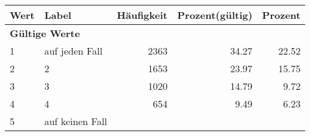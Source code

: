      \begin{longtable}{lXrrr}
     \toprule
     \textbf{Wert} & \textbf{Label} & \textbf{Häufigkeit} & \textbf{Prozent(gültig)} & \textbf{Prozent} \\
     \endhead
     \midrule
     \multicolumn{5}{l}{\textbf{Gültige Werte}}\\

     1 &
     \multicolumn{1}{X}{ auf jeden Fall   } &


       \num{2363} &
       \num[round-mode=places,round-precision=2]{34,27} &
         \num[round-mode=places,round-precision=2]{22,52} \\

     2 &
     \multicolumn{1}{X}{ 2   } &


       \num{1653} &
       \num[round-mode=places,round-precision=2]{23,97} &
         \num[round-mode=places,round-precision=2]{15,75} \\

     3 &
     \multicolumn{1}{X}{ 3   } &


       \num{1020} &
       \num[round-mode=places,round-precision=2]{14,79} &
         \num[round-mode=places,round-precision=2]{9,72} \\

     4 &
     \multicolumn{1}{X}{ 4   } &


       \num{654} &
       \num[round-mode=places,round-precision=2]{9,49} &
         \num[round-mode=places,round-precision=2]{6,23} \\

     5 &
     \multicolumn{1}{X}{ auf keinen Fall   } &



\end{longtable}

